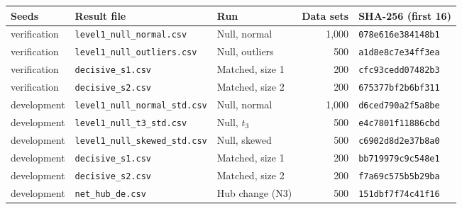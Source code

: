 \begin{tabular}{lllrl}
\toprule
Seeds & Result file & Run & Data sets & SHA-256 (first 16) \\
\midrule
verification & \texttt{level1\_null\_normal.csv} & Null, normal & 1,000 & \texttt{078e616e384148b1} \\
verification & \texttt{level1\_null\_outliers.csv} & Null, outliers & 500 & \texttt{a1d8e8c7e34ff3ea} \\
verification & \texttt{decisive\_s1.csv} & Matched, size 1 & 200 & \texttt{cfc93cedd07482b3} \\
verification & \texttt{decisive\_s2.csv} & Matched, size 2 & 200 & \texttt{675377bf2b6bf311} \\
development & \texttt{level1\_null\_normal\_std.csv} & Null, normal & 1,000 & \texttt{d6ced790a2f5a8be} \\
development & \texttt{level1\_null\_t3\_std.csv} & Null, $t_3$ & 500 & \texttt{e4c7801f11886cbd} \\
development & \texttt{level1\_null\_skewed\_std.csv} & Null, skewed & 500 & \texttt{c6902d8d2e37b8a0} \\
development & \texttt{decisive\_s1.csv} & Matched, size 1 & 200 & \texttt{bb719979c9c548e1} \\
development & \texttt{decisive\_s2.csv} & Matched, size 2 & 200 & \texttt{f7a69c575b5b29ba} \\
development & \texttt{net\_hub\_de.csv} & Hub change (N3) & 500 & \texttt{151dbf7f74c41f16} \\
\bottomrule
\end{tabular}
